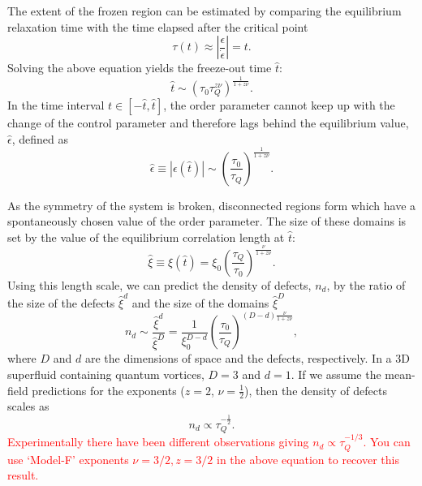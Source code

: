 The extent of the frozen region can be estimated by comparing the equilibrium
relaxation time with the time elapsed after the critical point
\begin{equation}
    \tau(t) \approx \left|\frac{\epsilon}{\dot{\epsilon}}\right|=t.
\end{equation}
Solving the above equation yields the freeze-out time $\hat{t}$:
\begin{equation}
    \hat{t} \sim (\tau_0\tau_Q^{z\nu})^{\frac{1}{1+z\nu}}.
    \label{eq: freeze-out-time}
\end{equation}
In the time interval $t \in [-\hat{t}, \hat{t}]$, the order parameter cannot
keep up with the change of the control parameter and therefore lags
behind the equilibrium value, $\hat{\epsilon}$, defined as
\begin{equation}
    \hat{\epsilon} \equiv |\epsilon(\hat{t})| \sim 
    \left(\frac{\tau_0}{\tau_Q}\right)^\frac{1}{1+z\nu}.
\end{equation}

As the symmetry of the system is broken, disconnected regions form which
have a spontaneously chosen value of the order parameter.
The size of these domains is set by the value of the equilibrium correlation
length at $\hat{t}$:
\begin{equation}
    \hat{\xi} \equiv \xi(\hat{t}) 
    = \xi_0 \left(\frac{\tau_Q}{\tau_0}\right)^\frac{\nu}{1 + z\nu}.
    \label{eq: KZM-domain-size}
\end{equation}
Using this length scale, we can predict the density of defects, $n_d$, by
the ratio of the size of the defects $\hat{\xi}^d$ and the size of the domains
$\hat{\xi}^D$
\begin{equation}
    n_d \sim \frac{\hat{\xi}^d}{\hat{\xi}^D}=\frac{1}{\xi_0^{D-d}}
    \left(\frac{\tau_0}{\tau_Q}\right)^{(D-d)\frac{\nu}{1 + z\nu}},
\end{equation}
where $D$ and $d$ are the dimensions of space and the defects, respectively.
In a 3D superfluid containing quantum vortices, $D=3$ and $d=1$.
If we assume the mean-field predictions for the exponents
($z=2$, $\nu=\frac{1}{2}$), then the density of defects scales as
\begin{equation}
    n_d \propto \tau_Q^{-\frac{1}{2}}.
\end{equation}
\textcolor{red}{Experimentally there have been different observations giving
$n_d \propto \tau_Q^{-1/3}$. You can use `Model-F' exponents $\nu=3/2, z=3/2$
in the above equation to recover this result.}

